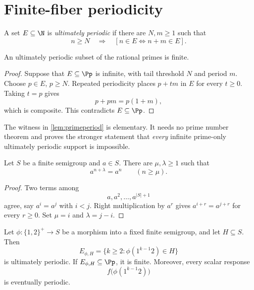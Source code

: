 \section{Finite-fiber periodicity}
\label{sec:finite}

\begin{definition}
A set \(E\subseteq\N\) is \emph{ultimately periodic} if there are
\(N,m\ge1\) such that
\[
        n\ge N
        \quad\Longrightarrow\quad
        [n\in E\Longleftrightarrow n+m\in E].
\]
\end{definition}

\begin{lemma}
\label{lem:primeperiod}
An ultimately periodic subset of the rational primes is finite.
\end{lemma}

\begin{proof}
Suppose that \(E\subseteq\Pp\) is infinite, with tail threshold \(N\) and
period \(m\).  Choose \(p\in E\), \(p\ge N\).  Repeated periodicity places
\(p+tm\) in \(E\) for every \(t\ge0\).  Taking \(t=p\) gives
\[
        p+pm=p(1+m),
\]
which is composite.  This contradicts \(E\subseteq\Pp\).
\end{proof}

The witness in \cref{lem:primeperiod} is elementary.  It needs no prime
number theorem and proves the stronger statement that \emph{every} infinite
prime-only ultimately periodic support is impossible.

\begin{lemma}
\label{lem:semigrouppower}
Let \(S\) be a finite semigroup and \(a\in S\).  There are
\(\mu,\lambda\ge1\) such that
\[
        a^{n+\lambda}=a^n\qquad(n\ge\mu).
\]
\end{lemma}

\begin{proof}
Two terms among
\[
        a,a^2,\ldots,a^{|S|+1}
\]
agree, say \(a^i=a^j\) with \(i<j\).  Right multiplication by \(a^r\)
gives \(a^{i+r}=a^{j+r}\) for every \(r\ge0\).  Set
\(\mu=i\) and \(\lambda=j-i\).
\end{proof}

\begin{theorem}
\label{thm:finite-semigroup}
Let \(\phi:\{1,2\}^{+}\to S\) be a morphism into a fixed finite semigroup,
and let \(H\subseteq S\).  Then
\[
 E_{\phi,H}
 =\{k\ge2:\phi(1^{k-1}2)\in H\}
\]
is ultimately periodic.  If \(E_{\phi,H}\subseteq\Pp\), it is finite.
Moreover, every scalar response
\[
        f\bigl(\phi(1^{k-1}2)\bigr)
\]
is eventually periodic.
\end{theorem}

